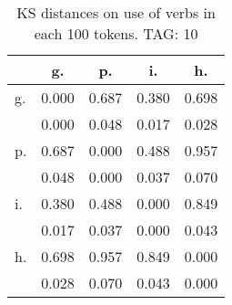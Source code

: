 \begin{table}[h!]
\begin{center}
\begin{tabular}{| l | c | c | c | c |}\hline
 & g. & p. & i. & h. \\\hline
g. & 0.000  & 0.687  & 0.380  & 0.698 \\\hline
 & 0.000  & 0.048  & 0.017  & 0.028 \\\hline
p. & 0.687  & 0.000  & 0.488  & 0.957 \\\hline
 & 0.048  & 0.000  & 0.037  & 0.070 \\\hline
i. & 0.380  & 0.488  & 0.000  & 0.849 \\\hline
 & 0.017  & 0.037  & 0.000  & 0.043 \\\hline
h. & 0.698  & 0.957  & 0.849  & 0.000 \\\hline
 & 0.028  & 0.070  & 0.043  & 0.000 \\\hline
\end{tabular}
\caption{KS distances on use of verbs in each 100 tokens. TAG: 10}
\end{center}
\end{table}
